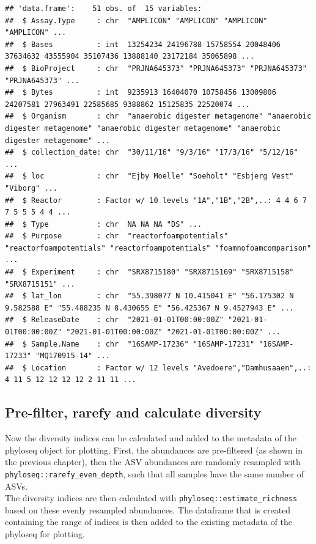 \documentclass[
]{book}
\begin{document}
\begin{verbatim}
## 'data.frame':    51 obs. of  15 variables:
##  $ Assay.Type     : chr  "AMPLICON" "AMPLICON" "AMPLICON" "AMPLICON" ...
##  $ Bases          : int  13254234 24196788 15758554 20048406 37634632 43555904 35107436 13888140 23172184 35065898 ...
##  $ BioProject     : chr  "PRJNA645373" "PRJNA645373" "PRJNA645373" "PRJNA645373" ...
##  $ Bytes          : int  9235913 16404070 10758456 13009806 24207581 27963491 22585685 9388862 15125835 22520074 ...
##  $ Organism       : chr  "anaerobic digester metagenome" "anaerobic digester metagenome" "anaerobic digester metagenome" "anaerobic digester metagenome" ...
##  $ collection_date: chr  "30/11/16" "9/3/16" "17/3/16" "5/12/16" ...
##  $ loc            : chr  "Ejby Moelle" "Soeholt" "Esbjerg Vest" "Viborg" ...
##  $ Reactor        : Factor w/ 10 levels "1A","1B","2B",..: 4 4 6 7 7 5 5 5 4 4 ...
##  $ Type           : chr  NA NA NA "DS" ...
##  $ Purpose        : chr  "reactorfoampotentials" "reactorfoampotentials" "reactorfoampotentials" "foamnofoamcomparison" ...
##  $ Experiment     : chr  "SRX8715180" "SRX8715169" "SRX8715158" "SRX8715151" ...
##  $ lat_lon        : chr  "55.398077 N 10.415041 E" "56.175302 N 9.582588 E" "55.488235 N 8.430655 E" "56.425367 N 9.4527943 E" ...
##  $ ReleaseDate    : chr  "2021-01-01T00:00:00Z" "2021-01-01T00:00:00Z" "2021-01-01T00:00:00Z" "2021-01-01T00:00:00Z" ...
##  $ Sample.Name    : chr  "16SAMP-17236" "16SAMP-17231" "16SAMP-17233" "MQ170915-14" ...
##  $ Location       : Factor w/ 12 levels "Avedoere","Damhusaaen",..: 4 11 5 12 12 12 12 2 11 11 ...
\end{verbatim}

\hfill\break

\hypertarget{pre-filter-rarefy-and-calculate-diversity}{%
\subsection{Pre-filter, rarefy and calculate diversity}\label{pre-filter-rarefy-and-calculate-diversity}}

Now the diversity indices can be calculated and added to the metadata of the phyloseq object for plotting. First, the abundances are pre-filtered (as shown in the previous chapter), then the ASV abundances are randomly resampled with \texttt{phyloseq::rarefy\_even\_depth}, such that all samples have the same number of ASVs.\\
The diversity indices are then calculated with \texttt{phyloseq::estimate\_richness} based on these evenly resampled abundances. The dataframe that is created containing the range of indices is then added to the existing metadata of the phyloseq for plotting.
\end{document}
